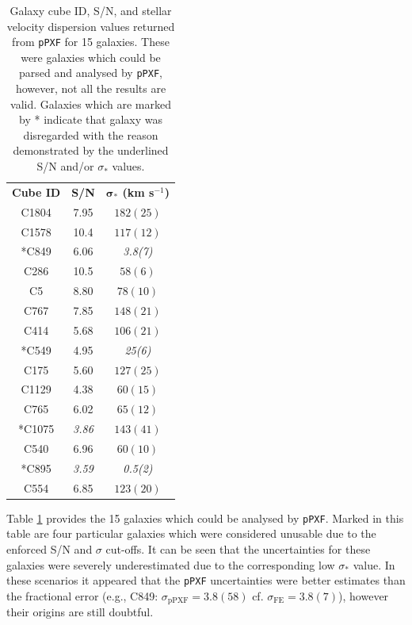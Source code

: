 \documentclass[12pt, twocolumn, nofootinbib]{revtex4-1}    %
\begin{document}
\begin{table}
\begin{center}
\begin{tabular}{c@{\hskip 20pt}c@{\hskip 20pt}c} 
\hline
\textbf{Cube ID} & \textbf{S/N} & \textbf{$\boldsymbol{\sigma_*}$ (km s$^{-1}$)} \\ [0.5ex] 
C1804 & 7.95 & $182(25)$ \\

C1578 & 10.4 & $117(12)$ \\

*C849 & 6.06 & \emph{3.8(7)} \\

C286 & 10.5 & $58(6)$ \\

C5 & 8.80 & $78(10)$ \\

C767 & 7.85 & $148(21)$ \\

C414 & 5.68 & $106(21)$ \\

*C549 & 4.95 & \emph{25(6)} \\

C175 & 5.60 & $127(25)$ \\

C1129 & 4.38 & $60(15)$ \\

C765 & 6.02 & $65(12)$ \\

*C1075 & \emph{3.86} & $143(41)$ \\

C540 & 6.96 & $60(10)$ \\

*C895 & \emph{3.59} & \emph{0.5(2)} \\

C554 & 6.85 & $123(20)$ \\
 \hline
\end{tabular}
\caption{Galaxy cube ID, S/N, and stellar velocity dispersion values returned from \texttt{pPXF} for 15 galaxies. These were galaxies which could be parsed and analysed by \texttt{pPXF}, however, not all the results are valid. Galaxies which are marked by * indicate that galaxy was disregarded with the reason demonstrated by the underlined S/N and/or $\sigma_*$ values.}
\label{table:ppxf_sigma_sn}
\end{center}
\end{table}

Table \ref{table:ppxf_sigma_sn} provides the 15 galaxies which could be analysed by \texttt{pPXF}. Marked in this table are four particular galaxies which were considered unusable due to the enforced S/N and $\sigma$ cut-offs. It can be seen that the uncertainties for these galaxies were severely underestimated due to the corresponding low $\sigma_*$ value. In these scenarios it appeared that the \texttt{pPXF} uncertainties were better estimates than the fractional error (e.g., C849: $\sigma_{\text{pPXF}}=3.8(58)$ cf. $\sigma_{\text{FE}}=3.8(7)$), however their origins are still doubtful.
\end{document}
